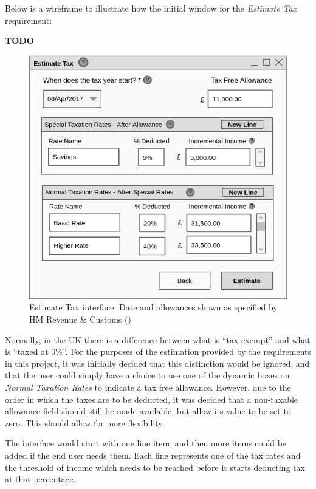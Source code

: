 Below is a wireframe to illustrate how the initial window for the
\emph{Estimate Tax} requirement:

\textbf{TODO}

\begin{figure}[ht!]
  \begin{center}
    \includegraphics[width=14cm]{./contents/img/Wireframe_-_Estimate_Tax.png}
  \end{center}
  \caption{Estimate Tax interface. Date and allowances shown as specified by HM
    Revenue \& Customs (\cite[][]{hmrc2018taxrates})}
  \label{fig:Wireframe.EstimateTax}
\end{figure}
\FloatBarrier

Normally, in the UK there is a difference between what is ``tax exempt'' and
what is ``taxed at 0\%''.  For the purposes of the estimation provided by
the requirements in this project, it was initially decided that this
distinction would be ignored, and that the user could simply have a choice to
use one of the dynamic boxes on \emph{Normal Taxation Rates} to indicate a tax
free allowance. However, due to the order in which the taxes are to be
deducted, it was decided that a non-taxable allowance field should still be
made available, but allow its value to be set to zero. This should allow for
more flexibility.

The interface would start with one line item, and then more items could be
added if the end user needs them. Each line represents one of the tax rates and
the threshold of income which needs to be reached before it starts deducting
tax at that percentage.

